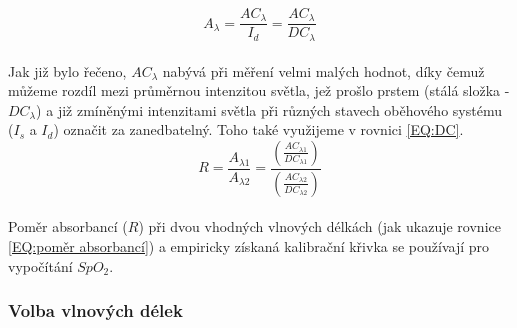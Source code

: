 \begin{equation}
    A_{\lambda} = \frac{AC_{\lambda}}{I_d} = \frac{AC_{\lambda}}{DC_{\lambda}}
    \label{EQ:DC}
\end{equation}\\
Jak již bylo řečeno, $AC_{\lambda}$ nabývá při měření velmi malých hodnot, díky čemuž můžeme rozdíl mezi průměrnou intenzitou světla, jež prošlo prstem (stálá složka - $DC_{\lambda}$) a již zmíněnými intenzitami světla při různých stavech oběhového systému ($I_s$ a $I_d$) označit za zanedbatelný. Toho také využijeme v rovnici \ref{EQ:DC}.\\
\begin{equation}
    R = \frac{A_{\lambda1}}{A_{\lambda2}} = \frac{(\frac{AC_{\lambda1}}{DC_{\lambda1}})}{(\frac{AC_{\lambda2}}{DC_{\lambda2}})}
    \label{EQ:poměr absorbancí}
\end{equation}\\
Poměr absorbancí ($R$) při dvou vhodných vlnových délkách (jak ukazuje rovnice \ref{EQ:poměr absorbancí}) a empiricky získaná kalibrační křivka se používají pro vypočítání $SpO_2$.\\

\subsubsection{Volba vlnových délek}
 

